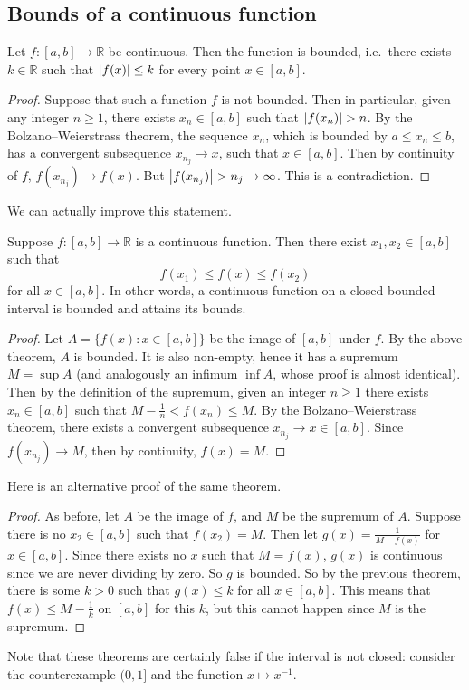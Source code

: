 \subsection{Bounds of a continuous function}
\begin{theorem}
	Let \(f \colon [a, b] \to \mathbb R\) be continuous.
	Then the function is bounded, i.e.\ there exists \(k \in \mathbb R\) such that \(\abs{f(x)} \leq k\) for every point \(x \in [a, b]\).
\end{theorem}
\begin{proof}
	Suppose that such a function \(f\) is not bounded.
	Then in particular, given any integer \(n \geq 1\), there exists \(x_n \in [a, b]\) such that \(\abs{f(x_n)} > n\).
	By the Bolzano--Weierstrass theorem, the sequence \(x_n\), which is bounded by \(a \leq x_n \leq b\), has a convergent subsequence \(x_{n_j} \to x\), such that \(x \in [a, b]\).
	Then by continuity of \(f\), \(f(x_{n_j}) \to f(x)\).
	But \(\abs{f(x_{n_j})} > n_j \to \infty\).
	This is a contradiction.
\end{proof}
We can actually improve this statement.
\begin{theorem}
	Suppose \(f \colon [a, b] \to \mathbb R\) is a continuous function.
	Then there exist \(x_1, x_2 \in [a, b]\) such that
	\[
		f(x_1) \leq f(x) \leq f(x_2)
	\]
	for all \(x \in [a, b]\).
	In other words, a continuous function on a closed bounded interval is bounded and attains its bounds.
\end{theorem}
\begin{proof}
	Let \(A = \{ f(x) \colon x \in [a, b] \}\) be the image of \([a, b]\) under \(f\).
	By the above theorem, \(A\) is bounded.
	It is also non-empty, hence it has a supremum \(M = \sup A\) (and analogously an infimum \(\inf A\), whose proof is almost identical).
	Then by the definition of the supremum, given an integer \(n \geq 1\) there exists \(x_n \in [a, b]\) such that \(M - \frac{1}{n} < f(x_n) \leq M\).
	By the Bolzano--Weierstrass theorem, there exists a convergent subsequence \(x_{n_j} \to x \in [a, b]\).
	Since \(f(x_{n_j}) \to M\), then by continuity, \(f(x) = M\).
\end{proof}
Here is an alternative proof of the same theorem.
\begin{proof}
	As before, let \(A\) be the image of \(f\), and \(M\) be the supremum of \(A\).
	Suppose there is no \(x_2 \in [a, b]\) such that \(f(x_2) = M\).
	Then let \(g(x) = \frac{1}{M - f(x)}\) for \(x \in [a, b]\).
	Since there exists no \(x\) such that \(M = f(x)\), \(g(x)\) is continuous since we are never dividing by zero.
	So \(g\) is bounded.
	So by the previous theorem, there is some \(k > 0\) such that \(g(x) \leq k\) for all \(x \in [a, b]\).
	This means that \(f(x) \leq M - \frac{1}{k}\) on \([a, b]\) for this \(k\), but this cannot happen since \(M\) is the supremum.
\end{proof}
Note that these theorems are certainly false if the interval is not closed: consider the counterexample \((0, 1]\) and the function \(x \mapsto x^{-1}\).


